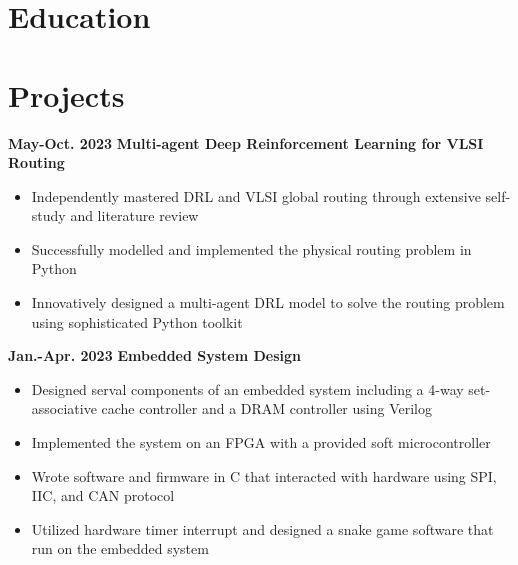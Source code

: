 \documentclass[11pt,a4paper,sans]{moderncv}
\begin{document}
\makecvtitle

\section{Education}

\section{Projects}

\cventry
{\textnormal{\textbf{May-Oct. 2023}}}
{\textnormal{\textbf{Multi-agent Deep Reinforcement Learning for VLSI Routing}}}
{}{}{}
{
    \begin{itemize}
    \item Independently mastered DRL and VLSI global routing through extensive self-study and literature review
    \item Successfully modelled and implemented the physical routing problem in Python
    \item Innovatively designed a multi-agent DRL model to solve the routing problem using sophisticated Python toolkit
\end{itemize}
}

\cventry
{\textnormal{\textbf{Jan.-Apr. 2023}}}
{\textnormal{\textbf{Embedded System Design}}}
{}{}{}
{
    \begin{itemize}
    \item Designed serval components of an embedded system including a 4-way set-associative cache controller and a DRAM controller using Verilog
    \item Implemented the system on an FPGA with a provided soft microcontroller 
    \item Wrote software and firmware in C that interacted with hardware using SPI, IIC, and CAN protocol 
    \item Utilized hardware timer interrupt and designed a snake game software that run on the embedded system
\end{itemize}
}
\end{document}
